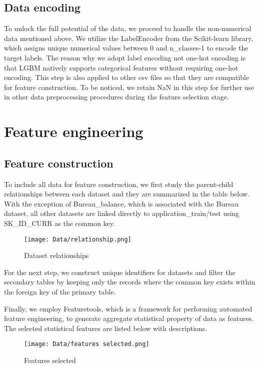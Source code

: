 \documentclass{article}
\begin{document}
\subsection{Data encoding}
To unlock the full potential of the data, we proceed to handle the non-numerical data mentioned above. We utilize the LabelEncoder from the Scikit-learn library, which assigns unique numerical values between 0 and n\_classes-1 to encode the target labels. The reason why we adopt label encoding not one-hot encoding is that LGBM natively supports categorical features without requiring one-hot encoding. This step is also applied to other csv files so that they are compatible for feature construction. To be noticed, we retain NaN in this step for further use in other data preprocessing procedures during the feature selection stage.

\section{Feature engineering}

\subsection{Feature construction}
To include all data for feature construction, we first study the parent-child relationships between each dataset and they are summarized in the table below. With the exception of Bureau\_balance, which is associated with the Bureau dataset, all other datasets are linked directly to application\_{train/test} using SK\_ID\_CURR as the common key.

\begin{figure}[H]
  \centering
  \texttt{[image: Data/relationship.png]}
  \caption{Dataset relationships}
\end{figure}

For the next step, we construct unique identifiers for datasets and filter the secondary tables by keeping only the records where the common key exists within the foreign key of the primary table.

Finally, we employ Featuretools, which is a framework for performing automated feature engineering, to generate aggregate statistical property of data as features. The selected statistical features are listed below with descriptions.

\begin{figure}[H]
  \centering
  \texttt{[image: Data/features selected.png]}
  \caption{Features selected}
\end{figure}
\end{document}
